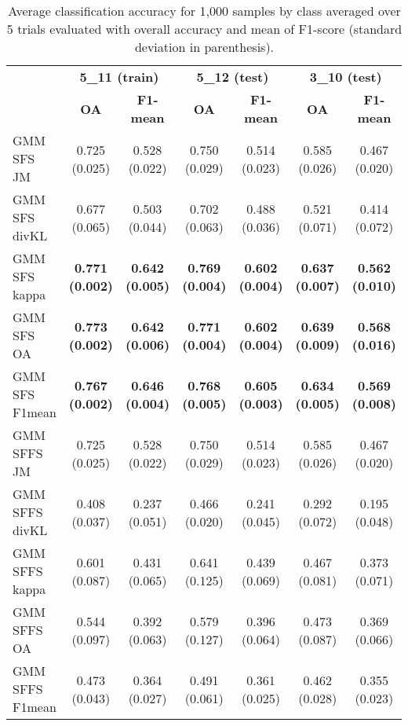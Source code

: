 \documentclass[journal,10pt,onecolumn]{IEEEtran}
\begin{document}
    \begin{table}[H]
        \centering
        \caption{Average classification accuracy for 1,000 samples by class averaged over 5 trials  evaluated with overall accuracy and mean of F1-score (standard deviation in parenthesis).\label{tab:potsdam-otbsimu-othereval}}
        \begin{tabular}{lcccccc}\toprule
             & \multicolumn{2}{c}{\bfseries 5\_11 (train)} & \multicolumn{2}{c}{\bfseries 5\_12 (test)} & \multicolumn{2}{c}{\bfseries 3\_10 (test)} \\ \cmidrule{2-7}
             & {\bfseries OA} & {\bfseries F1-mean} & {\bfseries OA} & {\bfseries F1-mean} & {\bfseries OA} & {\bfseries F1-mean} \\ \cmidrule{2-7}

            GMM SFS JM &      0.725 (0.025) & 0.528 (0.022) & 0.750 (0.029) & 0.514 (0.023) & 0.585 (0.026) & 0.467 (0.020) \\
            GMM SFS divKL &   0.677 (0.065) & 0.503 (0.044) & 0.702 (0.063) & 0.488 (0.036) & 0.521 (0.071) & 0.414 (0.072) \\
            GMM SFS kappa &   {\bfseries 0.771 (0.002)} & {\bfseries 0.642 (0.005)} & {\bfseries 0.769 (0.004)} & {\bfseries 0.602 (0.004)} & {\bfseries 0.637 (0.007)} & {\bfseries 0.562 (0.010)} \\
            GMM SFS OA &      {\bfseries 0.773 (0.002)} & {\bfseries 0.642 (0.006)} & {\bfseries 0.771 (0.004)} & {\bfseries 0.602 (0.004)} & {\bfseries 0.639 (0.009)} & {\bfseries 0.568 (0.016)} \\
            GMM SFS F1mean &  {\bfseries 0.767 (0.002)} & {\bfseries 0.646 (0.004)} & {\bfseries 0.768 (0.005)} & {\bfseries 0.605 (0.003)} & {\bfseries 0.634 (0.005)} & {\bfseries 0.569 (0.008)} \\
            GMM SFFS JM &     0.725 (0.025) & 0.528 (0.022) & 0.750 (0.029) & 0.514 (0.023) & 0.585 (0.026) & 0.467 (0.020) \\
            GMM SFFS divKL &  0.408 (0.037) & 0.237 (0.051) & 0.466 (0.020) & 0.241 (0.045) & 0.292 (0.072) & 0.195 (0.048) \\
            GMM SFFS kappa &  0.601 (0.087) & 0.431 (0.065) & 0.641 (0.125) & 0.439 (0.069) & 0.467 (0.081) & 0.373 (0.071) \\
            GMM SFFS OA &     0.544 (0.097) & 0.392 (0.063) & 0.579 (0.127) & 0.396 (0.064) & 0.473 (0.087) & 0.369 (0.066) \\
            GMM SFFS F1mean & 0.473 (0.043) & 0.364 (0.027) & 0.491 (0.061) & 0.361 (0.025) & 0.462 (0.028) & 0.355 (0.023) \\
            \bottomrule
        \end{tabular}
    \end{table}
\end{document}
